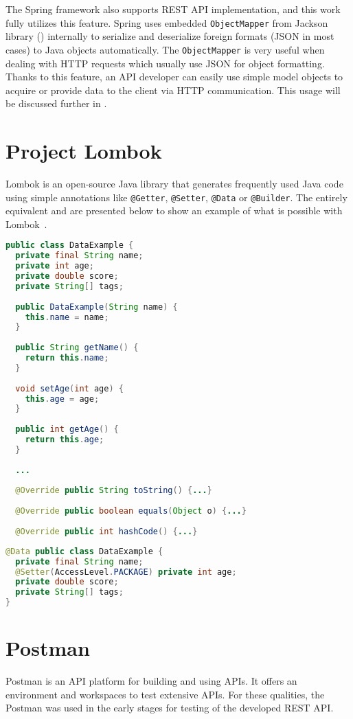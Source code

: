 The Spring framework also supports REST API implementation, and this work fully utilizes this feature.
Spring uses embedded \texttt{ObjectMapper} from Jackson library () internally to serialize and deserialize foreign formats (JSON in most cases) to Java objects automatically. The \texttt{ObjectMapper} is very useful when dealing with HTTP requests which usually use JSON for object formatting. Thanks to this feature, an API developer can easily use simple model objects to acquire or provide data to the client via HTTP communication.
This usage will be discussed further in .


\section{Project Lombok} \label{sec:lombok}
Lombok is an open-source Java library that generates frequently used Java code using simple annotations like \texttt{@Getter}, \texttt{@Setter}, \texttt{@Data} or \texttt{@Builder}.
The entirely equivalent  and  are presented below to show an example of what is possible with Lombok~\cite{lombok}.
\begin{lstlisting}[language=Java, caption=Vanilla Java, label=lst:vanilla]
public class DataExample {
  private final String name;
  private int age;
  private double score;
  private String[] tags;
  
  public DataExample(String name) {
    this.name = name;
  }
  
  public String getName() {
    return this.name;
  }
  
  void setAge(int age) {
    this.age = age;
  }
  
  public int getAge() {
    return this.age;
  }
  
  ...
  
  @Override public String toString() {...}
  
  @Override public boolean equals(Object o) {...}
  
  @Override public int hashCode() {...}
\end{lstlisting}
\begin{lstlisting}[language=Java, caption=Java with Lombok, label=lst:lombok]
@Data public class DataExample {
  private final String name;
  @Setter(AccessLevel.PACKAGE) private int age;
  private double score;
  private String[] tags;
}
\end{lstlisting}


\section{Postman} \label{sec:postman}
Postman is an API platform for building and using APIs. It offers an environment and workspaces to test extensive APIs.
For these qualities, the Postman was used in the early stages for testing of the developed REST API.


